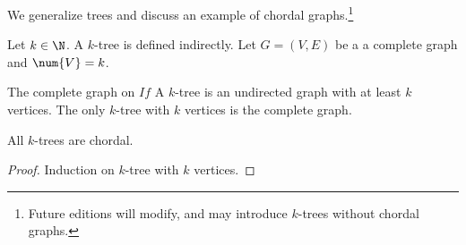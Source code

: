 

We generalize trees and discuss an example of chordal graphs.\footnote{Future editions will modify, and may introduce $k$-trees without chordal graphs.}


Let $k \in \N$.
A $k$-tree is defined indirectly.
Let $G = (V, E)$ be a a complete graph and $\num{V} = k$.

The complete graph on $
If $
A \t{$k$-tree} is an undirected graph with at least $k$ vertices.
The only $k$-tree with $k$ vertices is the complete graph.


\begin{prop}

All $k$-trees are chordal.

\begin{proof}

  Induction on $k$-tree with $k$ vertices.

\end{proof}

\end{prop}

\blankpage
